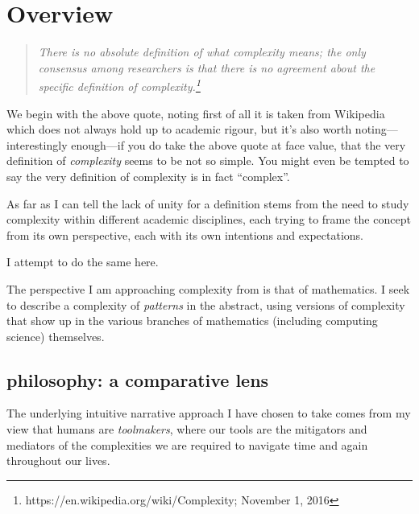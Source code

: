 \documentclass[twoside]{article}
\begin{document}
\section*{Overview}

\begin{verse}
\em
There is no absolute definition of what complexity means; the only consensus among researchers is that there is no
agreement about the specific definition of complexity.\footnote{https://en.wikipedia.org/wiki/Complexity; November 1, 2016}
\end{verse}

We begin with the above quote, noting first of all it is taken from Wikipedia which does not always hold up to academic rigour,
but it's also worth noting---interestingly enough---if you do take the above quote at face value, that the very definition of
\emph{complexity} seems to be not so simple.  You might even be tempted to say the very definition of complexity is in fact ``complex''.

As far as I can tell the lack of unity for a definition stems from the need to study complexity within different academic disciplines,
each trying to frame the concept from its own perspective, each with its own intentions and expectations.

I attempt to do the same here.

The perspective I am approaching complexity from is that of mathematics. I seek to describe a complexity of
\emph{patterns} in the abstract, using versions of complexity that show up in the various branches of mathematics
(including computing science) themselves.

\subsection*{philosophy: a comparative lens}

The underlying intuitive narrative approach I have chosen to take comes from my view that humans are \emph{toolmakers}, where
our tools are the mitigators and mediators of the complexities we are required to navigate time and again throughout our lives.
\end{document}
